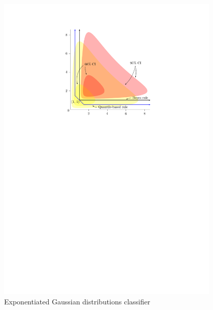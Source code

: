 \begin{figure}[ht]
  \caption{Exponentiated Gaussian distributions classifier}
  \label{fig:exponentiated-gaussian}
  \centering
  \vspace{5mm}

  \begin{minipage}[t]{0.49\linewidth}
    \flushleft
    \includegraphics[width=0.95\textwidth]{exp_gauss_ci}
  \end{minipage}
  \begin{minipage}[t]{0.49\linewidth}
    \flushright

\end{minipage}
\end{figure}

